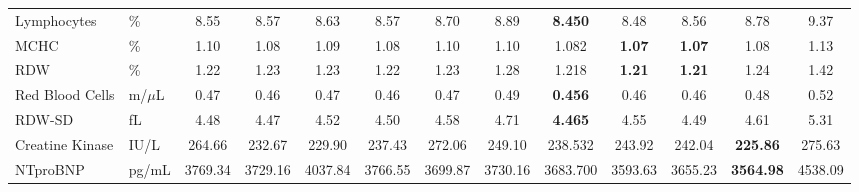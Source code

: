 \documentclass{article}
\begin{document}
\begin{table}[htbp]
\begin{tabular}{llccccccccccc}
                        Lymphocytes & \% & 8.55 & 8.57 & 8.63 & 8.57 & 8.70 & 8.89 & \textbf{8.450} & 8.48 & 8.56 & 8.78 & 9.37 \\
                        MCHC & \%  & 1.10 & 1.08 & 1.09 & 1.08 & 1.10 & 1.10 & 1.082 & \textbf{1.07} & \textbf{1.07} & 1.08 & 1.13 \\
                        RDW & \% & 1.22 & 1.23 & 1.23 & 1.22 & 1.23 & 1.28 & 1.218 & \textbf{1.21} & \textbf{1.21} & 1.24 & 1.42 \\
                        Red Blood Cells & m/$\mu$L & 0.47 & 0.46 & 0.47 & 0.46 & 0.47 & 0.49 & \textbf{0.456} & 0.46 & 0.46 & 0.48 & 0.52 \\
                        RDW-SD & fL & 4.48 & 4.47 & 4.52 & 4.50 & 4.58 & 4.71 & \textbf{4.465} & 4.55 & 4.49 & 4.61 & 5.31 \\
                        Creatine Kinase & IU/L & 264.66 & 232.67 & 229.90 & 237.43 & 272.06 & 249.10 & 238.532 & 243.92 & 242.04 & \textbf{225.86} & 275.63 \\
                        NTproBNP & pg/mL & 3769.34 & 3729.16 & 4037.84 & 3766.55 & 3699.87 & 3730.16 & 3683.700 & 3593.63 & 3655.23 & \textbf{3564.98} & 4538.09 \\
                        \bottomrule
                    \end{tabular}
                    \label{tab:results_overview_labvalues}
                \end{table}
\end{document}
